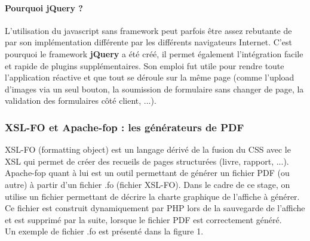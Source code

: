 \documentclass{article}
\begin{document}
\begin{sffamily}
\paragraph{Pourquoi jQuery ?} L'utilisation du javascript sans framework peut parfois être assez rebutante de par son implémentation différente par les différents 
navigateurs Internet. C'est pourquoi le framework \textbf{jQuery} a été créé, il permet également l'intégration facile et rapide de plugins supplémentaires. Son emploi fut 
utile pour rendre toute l'application réactive et que tout se déroule sur la même page (comme l'upload d'images via un seul bouton, la soumission de formulaire sans changer 
de page, la validation des formulaires côté client, ...).

\subsubsection{XSL-FO et Apache-fop : les générateurs de PDF}

XSL-FO (formatting object) est un langage dérivé de la fusion du CSS avec le XSL qui permet de créer des recueils de pages structurées (livre, rapport, ...). Apache-fop 
quant à lui est un outil permettant de générer un fichier PDF (ou autre) à partir d'un fichier .fo (fichier XSL-FO). Dans le cadre de ce stage, on utilise un fichier 
permettant de décrire la charte graphique de l'affiche à générer. Ce fichier est construit dynamiquement par PHP lors de la sauvegarde de l'affiche et est supprimé par la 
suite, lorsque le fichier PDF est correctement généré.\\
Un exemple de fichier .fo est présenté dans la figure 1.


\end{sffamily}
\end{document}
